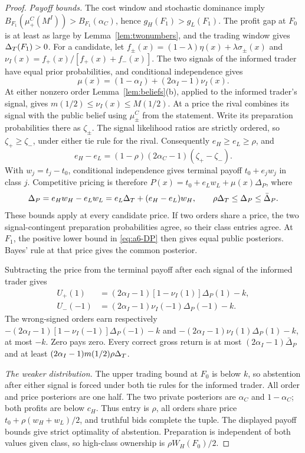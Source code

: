 \begin{proof}
\emph{Payoff bounds.} The cost window and stochastic dominance imply
\(B_{F_1}(\mu^C_+(M^I))>B_{F_1}(\alpha_C)\), hence \(g_H(F_1)>g_L(F_1)\).
The profit gap at \(F_0\) is at least as large by Lemma~\ref{lem:twonumbers}, and the trading window gives
\(\Delta_T(F_1)>0\). For a candidate, let
\(f_\pm(x)=(1-\lambda)\eta(x)+\lambda\sigma_\pm(x)\) and
\(\nu_I(x)=f_+(x)/[f_+(x)+f_-(x)]\). The two signals of the informed trader have equal prior probabilities, and conditional
independence gives
\[
\mu(x)=(1-\alpha_I)+(2\alpha_I-1)\nu_I(x).
\]
At either nonzero order Lemma~\ref{lem:beliefs}(b), applied to the informed trader's signal, gives
\(m(1/2)\le\nu_I(x)\le M(1/2)\). At a price the rival combines its signal with the public belief using
\(\mu^C_\pm\) from the statement. Write its preparation probabilities there as \(\zeta_\pm\).
The signal likelihood ratios are strictly ordered, so \(\zeta_+\ge\zeta_-\), under either tie rule for the rival.
Consequently \(e_H\ge e_L\ge\rho\), and
\[
e_H-e_L=(1-\rho)(2\alpha_C-1)(\zeta_+-\zeta_-).
\]
With \(w_j=t_j-t_0\), conditional independence gives terminal payoff \(t_0+e_jw_j\) in class \(j\).
Competitive pricing is therefore \(P(x)=t_0+e_Lw_L+\mu(x)\Delta_P\), where
\begin{equation}\label{eq:a6-DP}
\Delta_P=e_Hw_H-e_Lw_L=e_L\Delta_T+(e_H-e_L)w_H,\qquad
\rho\Delta_T\le\Delta_P\le\bar\Delta_P.
\end{equation}
These bounds apply at every candidate price. If two orders share a price, the two signal-contingent preparation
probabilities agree, so their class entries agree. At \(F_1\), the positive lower bound in
\eqref{eq:a6-DP} then gives equal public posteriors. Bayes' rule at that price gives the common posterior.

Subtracting the price from the terminal payoff after each signal of the informed trader gives
\[
\begin{aligned}
U_+(1)&=(2\alpha_I-1)[1-\nu_I(1)]\Delta_P(1)-k,\\
U_-(-1)&=(2\alpha_I-1)\nu_I(-1)\Delta_P(-1)-k.
\end{aligned}
\]
The wrong-signed orders earn respectively
\(-(2\alpha_I-1)[1-\nu_I(-1)]\Delta_P(-1)-k\) and
\(-(2\alpha_I-1)\nu_I(1)\Delta_P(1)-k\), at most \(-k\). Zero pays zero.
Every correct gross return is at most \((2\alpha_I-1)\bar\Delta_P\) and at least
\((2\alpha_I-1)m(1/2)\rho\Delta_T\).

\emph{The weaker distribution.} The upper trading bound at \(F_0\) is below \(k\), so abstention after either signal
is forced under both tie rules for the informed trader. All order and price posteriors are one half. The two private posteriors
are \(\alpha_C\) and \(1-\alpha_C\); both profits are below \(c_H\). Thus entry is \(\rho\), all orders share
price \(t_0+\rho(w_H+w_L)/2\), and truthful bids complete the tuple. The displayed payoff bounds give strict
optimality of abstention. Preparation is independent of both values given class, so high-class ownership is
\(\rho W_H(F_0)/2\).


\end{proof}
